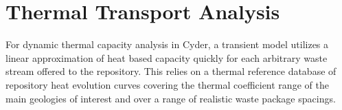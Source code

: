 

\section{Thermal Transport Analysis}

For dynamic thermal capacity analysis in Cyder, a transient model utilizes a 
linear approximation of heat based capacity quickly for each 
arbitrary waste stream offered to the repository. This relies on a thermal reference database of repository heat 
evolution curves covering the thermal coefficient range of the main geologies of 
interest and over a range of realistic waste package spacings. 



